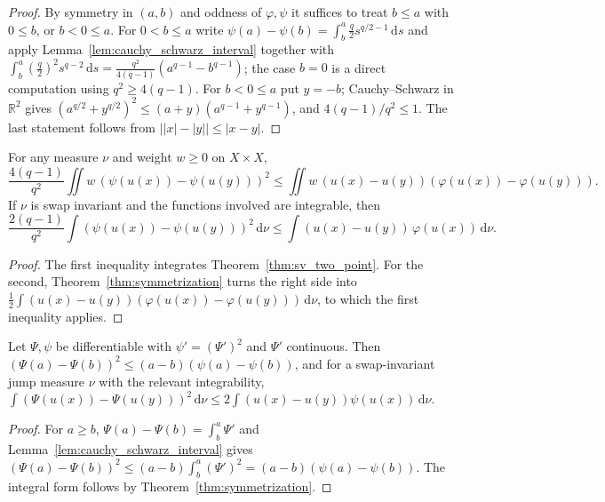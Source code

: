 \begin{proof}
\leanok
By symmetry in $(a, b)$ and oddness of $\varphi, \psi$ it suffices to treat $b \le a$ with $0 \le b$, or $b < 0 \le a$. For $0 < b \le a$ write $\psi(a) - \psi(b) = \int_b^a \tfrac q2 s^{q/2 - 1}\, \mathrm{d}s$ and apply Lemma~\ref{lem:cauchy_schwarz_interval} together with $\int_b^a (\tfrac q2)^2 s^{q-2}\, \mathrm{d}s = \frac{q^2}{4(q-1)} (a^{q-1} - b^{q-1})$; the case $b = 0$ is a direct computation using $q^2 \ge 4(q-1)$. For $b < 0 \le a$ put $y = -b$; Cauchy--Schwarz in $\mathbb{R}^2$ gives $(a^{q/2} + y^{q/2})^2 \le (a + y)(a^{q-1} + y^{q-1})$, and $4(q-1)/q^2 \le 1$. The last statement follows from $\bigl\lvert \lvert x \rvert - \lvert y \rvert \bigr\rvert \le \lvert x - y \rvert$.
\end{proof}

\begin{theorem}\label{thm:sv_energy}
\leanok
For any measure $\nu$ and weight $w \ge 0$ on $X \times X$,
\[
  \frac{4(q-1)}{q^2} \iint w\, (\psi(u(x)) - \psi(u(y)))^2 \le \iint w\, (u(x) - u(y))(\varphi(u(x)) - \varphi(u(y))).
\]
If $\nu$ is swap invariant and the functions involved are integrable, then
\[
  \frac{2(q-1)}{q^2} \int (\psi(u(x)) - \psi(u(y)))^2\, \mathrm{d}\nu \le \int (u(x) - u(y))\, \varphi(u(x))\, \mathrm{d}\nu.
\]
\end{theorem}

\begin{proof}
\leanok
The first inequality integrates Theorem~\ref{thm:sv_two_point}. For the second, Theorem~\ref{thm:symmetrization} turns the right side into $\frac12 \int (u(x) - u(y))(\varphi(u(x)) - \varphi(u(y)))\, \mathrm{d}\nu$, to which the first inequality applies.
\end{proof}

\begin{theorem}\label{thm:gen_sv}
\leanok
Let $\Psi, \psi$ be differentiable with $\psi' = (\Psi')^2$ and $\Psi'$ continuous. Then $(\Psi(a) - \Psi(b))^2 \le (a - b)(\psi(a) - \psi(b))$, and for a swap-invariant jump measure $\nu$ with the relevant integrability, $\int (\Psi(u(x)) - \Psi(u(y)))^2\, \mathrm{d}\nu \le 2 \int (u(x) - u(y)) \psi(u(x))\, \mathrm{d}\nu$.
\end{theorem}

\begin{proof}
\leanok
For $a \ge b$, $\Psi(a) - \Psi(b) = \int_b^a \Psi'$ and Lemma~\ref{lem:cauchy_schwarz_interval} gives $(\Psi(a) - \Psi(b))^2 \le (a - b) \int_b^a (\Psi')^2 = (a - b)(\psi(a) - \psi(b))$. The integral form follows by Theorem~\ref{thm:symmetrization}.
\end{proof}
